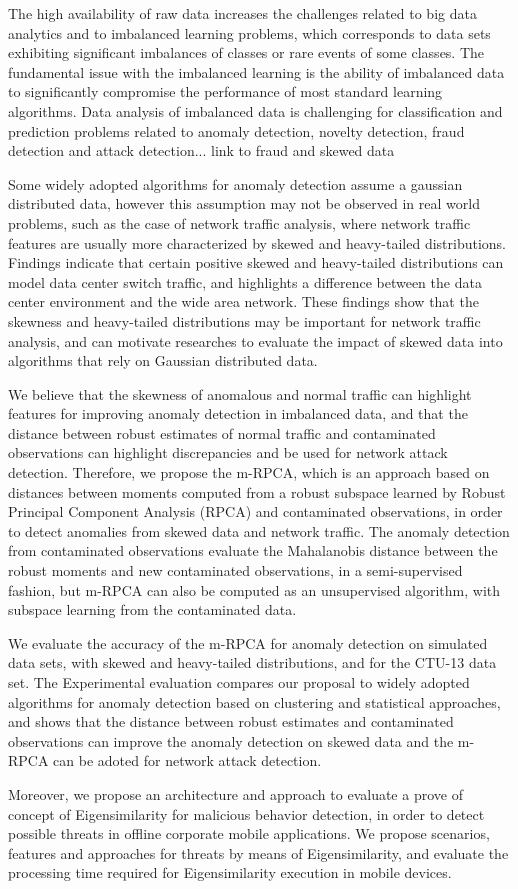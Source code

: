 {The high availability of raw data increases the challenges related to big data analytics and to imbalanced learning problems, which corresponds to data sets exhibiting significant imbalances of classes or rare events of some classes. The fundamental issue with the imbalanced learning is the ability of imbalanced data to significantly compromise the performance of most standard learning algorithms. Data analysis of imbalanced data is challenging for classification and prediction problems related to anomaly detection, novelty detection, fraud detection and attack detection... link to fraud and skewed data

Some widely adopted algorithms for anomaly detection assume a gaussian distributed data, however this assumption may not be observed in real world problems, such as the case of network traffic analysis, where network traffic features are usually more characterized by skewed and heavy-tailed distributions. Findings indicate that certain positive skewed and heavy-tailed distributions can model data center switch traffic, and highlights a difference between the data center environment and the wide area network. These findings show that the skewness and heavy-tailed distributions may be important for network traffic analysis, and can motivate researches to evaluate the impact of skewed data into algorithms that rely on Gaussian distributed data. 

We believe that the skewness of anomalous and normal traffic can highlight features for improving anomaly detection in imbalanced data, and that the distance between robust estimates of normal traffic and contaminated observations can highlight discrepancies and be used for network attack detection. Therefore, we propose the m-RPCA, which is an approach based on distances between moments computed from a robust subspace learned by Robust Principal Component Analysis (RPCA) and contaminated observations, in order to detect anomalies from skewed data and network traffic. The anomaly detection from contaminated observations evaluate the Mahalanobis distance between the robust moments and new contaminated observations, in a semi-supervised fashion, but m-RPCA can also be computed as an unsupervised algorithm, with subspace learning from the contaminated data. 

We evaluate the accuracy of the m-RPCA for anomaly detection on simulated data sets, with skewed and heavy-tailed distributions, and for the CTU-13 data set. The Experimental evaluation compares our proposal to widely adopted algorithms for anomaly detection based on clustering and statistical approaches, and shows that the distance between robust estimates and contaminated observations can improve the anomaly detection on skewed data and the m-RPCA can be adoted for network attack detection.

Moreover, we propose an architecture and approach to evaluate a prove of concept of Eigensimilarity for malicious behavior detection, in order to detect possible threats in offline corporate mobile applications. We propose scenarios, features and approaches for threats by means of Eigensimilarity, and evaluate the processing time required for Eigensimilarity execution in mobile devices.

}
